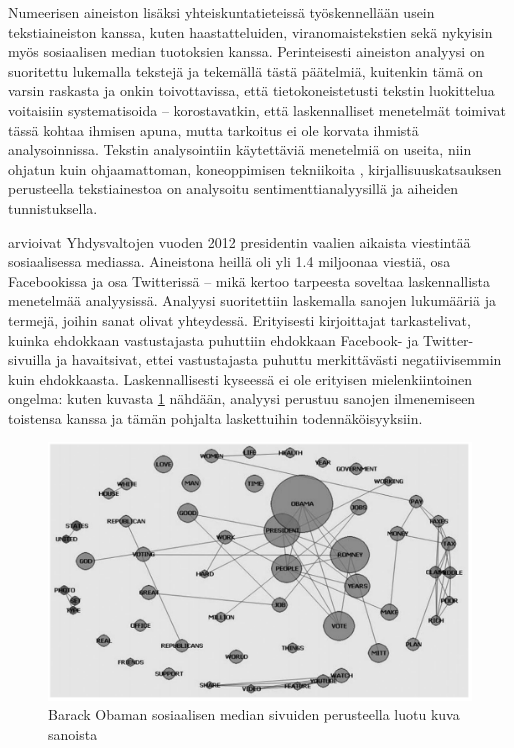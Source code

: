 \documentclass[finnish,gradu,twoside,12pt]{tktltiki}
\begin{document}
{Numeerisen aineiston lisäksi yhteiskuntatieteissä työskennellään usein tekstiaineiston kanssa, kuten haastatteluiden, viranomaistekstien sekä nykyisin myös sosiaalisen median tuotoksien kanssa. Perinteisesti aineiston analyysi on suoritettu lukemalla tekstejä ja tekemällä tästä päätelmiä, kuitenkin tämä on varsin raskasta ja onkin toivottavissa, että tietokoneistetusti tekstin luokittelua voitaisiin systematisoida -- \citet{Grimmer2013} korostavatkin, että laskennalliset menetelmät toimivat tässä kohtaa ihmisen apuna, mutta tarkoitus ei ole korvata ihmistä analysoinnissa. Tekstin analysointiin käytettäviä menetelmiä on useita, niin ohjatun kuin ohjaamattoman, koneoppimisen tekniikoita \citep[esimerkiksi][]{Grimmer2013}, kirjallisuuskatsauksen perusteella tekstiainestoa on analysoitu sentimenttianalyysillä ja aiheiden tunnistuksella.

\citet{groshek2013public} arvioivat Yhdysvaltojen vuoden 2012 presidentin vaalien aikaista viestintää sosiaalisessa mediassa. Aineistona heillä oli yli 1.4 miljoonaa viestiä, osa Facebookissa ja osa Twitterissä -- mikä kertoo tarpeesta soveltaa laskennallista menetelmää analyysissä. Analyysi suoritettiin laskemalla sanojen lukumääriä ja termejä, joihin sanat olivat yhteydessä. Erityisesti kirjoittajat tarkastelivat, kuinka ehdokkaan vastustajasta puhuttiin ehdokkaan Facebook- ja Twitter-sivuilla ja havaitsivat, ettei vastustajasta puhuttu merkittävästi negatiivisemmin kuin ehdokkaasta. Laskennallisesti kyseessä ei ole erityisen mielenkiintoinen ongelma: kuten kuvasta \ref{fig:wordnet} nähdään, analyysi perustuu sanojen ilmenemiseen toistensa kanssa ja tämän pohjalta laskettuihin todennäköisyyksiin.

\begin{figure}
\includegraphics[scale=.75]{images/word_net.png} 
\caption{Barack Obaman sosiaalisen median sivuiden perusteella luotu kuva sanoista \citep{groshek2013public}}
\label{fig:wordnet}
\end{figure}

}
\end{document}
